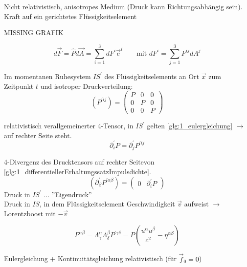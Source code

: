 \documentclass[a4paper, 11pt]{article}
\numberwithin{equation}{section}
\begin{document}


Nicht relativistisch, anisotropes Medium (Druck kann Richtungsabhängig sein).\\
Kraft auf ein gerichtetes Flüssigkeitselement

MISSING GRAFIK

\begin{equation}
d \vec{F} = \hat{P} d \vec{A} = \sum_{i =1}^3 d F^i \vec{e}^i \qquad \text{mit } dF^i = \sum_{j=1}^3 P^{i j} dA^j
\end{equation}

Im momentanen Ruhesystem $IS^\prime$ des Flüssigkeitselements an Ort $\vec{x}$ zum Zeitpunkt $t$ und isotroper Druckverteilung:
\begin{equation}
\left(P^{\prime ij} \right) = \begin{pmatrix}
P &0 &0 \\ 0 & P & 0\\ 0&0 & P 
\end{pmatrix}
\end{equation}

relativistisch verallgemeinerter 4-Tensor, in $IS^\prime$ gelten \ref{glg:1_eulergleichung} $\rightarrow$ auf rechter Seite steht.
\begin{equation}
\partial^\prime_i P = \partial^\prime_j P^{\prime i j}
\end{equation}

4-Divergenz des Drucktensors auf rechter Seitevon \ref{glg:1_differentiellerErhaltungssatzImpulsdichte}.
\begin{equation}
\left( \partial^\prime_\beta P^{\prime \alpha \beta} \right) = \begin{pmatrix}
0 &  \partial^\prime_i P
\end{pmatrix}
\end{equation}
Druck in $IS^\prime$ ... ''Eigendruck''\\
Druck in $IS$, in dem Flüssigkeitselement Geschwindigkeit $\vec{v}$ aufweist $\rightarrow$ Lorentzboost mit $- \vec{v}$

\begin{equation}
P^{\alpha \beta} = \Lambda^\alpha_\gamma \Lambda^\beta_\delta P^{\prime \gamma \delta} = P \left( \dfrac{u^\alpha u^\beta}{c^2} - \eta^{\alpha \beta} \right)
\end{equation}

Eulergleichung + Kontinuitätsgleichung relativistisch (für $\vec{f}_0 = 0$)
\end{document}
